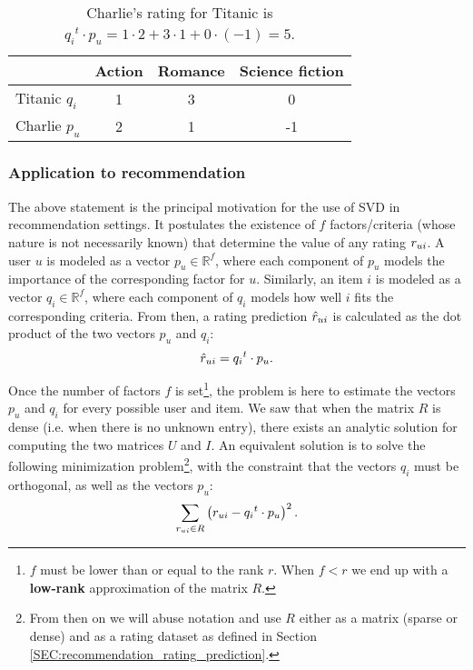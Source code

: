 \begin{table}[h!] \centering \begin{tabular}{ l   c  c  c }
\toprule
    & Action & Romance & Science fiction\\
  \midrule
    Titanic $q_i$ & 1 & 3 & 0\\
    Charlie $p_u$ & 2 & 1 & -1\\
\bottomrule
\end{tabular}
  \caption{Charlie's rating for Titanic is ${q_i}^t \cdot p_u = 1 \cdot 2 + 3
  \cdot 1 + 0 \cdot (-1) = 5$.}
\label{TAB:Charlie_Titanic}
\end{table}

\subsubsection{Application to recommendation}

The above statement is the principal motivation for the use of SVD in recommendation
settings. It postulates the existence of $f$ factors/criteria (whose nature is
not necessarily known) that determine the value of any rating $r_{ui}$.  A user
$u$ is modeled as a vector $p_u \in \mathbb{R}^f$, where each component of
$p_u$ models the importance of the corresponding factor for $u$.  Similarly, an
item $i$ is modeled as a vector $q_i \in \mathbb{R}^f$, where each component of
$q_i$ models how well $i$ fits the corresponding criteria.  From then, a rating
prediction $\hat{r}_{ui}$ is calculated as the dot product of the two vectors $p_u$
and $q_i$:
$$\hat{r}_{ui} = {q_i}^t \cdot p_u.$$

Once the number of factors $f$ is set\footnote{$f$ must be lower than or equal
to the rank $r$. When $f < r$ we end up with a \textbf{low-rank} approximation
of the matrix $R$.}, the problem is here to estimate the
vectors $p_u$ and $q_i$ for every possible user and item. We saw that when the
matrix $R$ is dense (i.e. when  there is no unknown entry), there exists an analytic
solution for computing the two matrices $U$ and $I$. An equivalent solution is
to solve the following minimization problem\footnote{From then on we will abuse
notation and use $R$ either as a matrix (sparse or dense) and as a rating
dataset as defined in Section \ref{SEC:recommendation_rating_prediction}.},
with the constraint that the vectors $q_i$ must be orthogonal, as well as the
vectors $p_u$:
$$
\sum_{r_{ui} \in R} \left(r_{ui} - {q_i}^t \cdot p_u \right)^2.
$$

